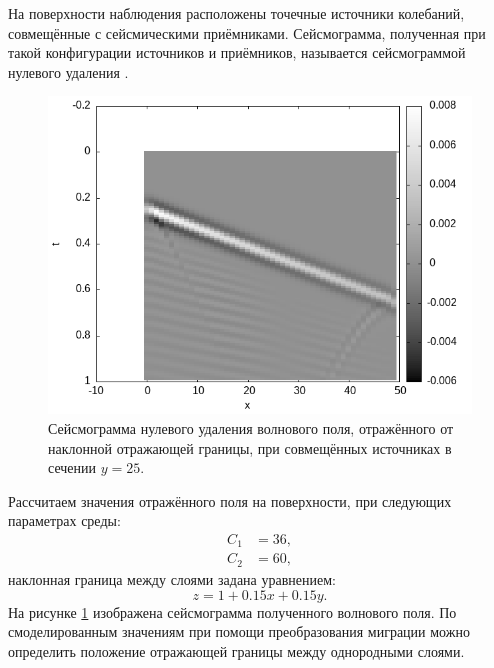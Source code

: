 \documentclass[a4paper, fontsize=14pt]{article}
\begin{document}
	На поверхности наблюдения расположены точечные источники колебаний, совмещённые с сейсмическими приёмниками. 
	Сейсмограмма, полученная при такой конфигурации источников и приёмников, называется сейсмограммой нулевого удаления \cite{timoshin}. 
	\begin{figure}[H]
		\centering
		\includegraphics[width=.7\textwidth]{tilt15c36_centr_seism.png}
		\caption{Сейсмограмма нулевого удаления волнового поля, отражённого от наклонной отражающей границы, при совмещённых источниках  в сечении $y=25$.}
		\label{fig:mig_tilt_seism}
	\end{figure}
	Рассчитаем значения отражённого поля на поверхности, при следующих параметрах среды: 
	\begin{align*}
		C_1 &= 36, \\
		C_2 &= 60,
	\end{align*}
	наклонная граница между слоями задана уравнением:
	\begin{equation}
		z=1+0.15 x+0.15 y.
		\label{eq:mig_mod}
	\end{equation}
	На рисунке \ref{fig:mig_tilt_seism} изображена сейсмограмма полученного волнового поля.
	По смоделированным значениям при помощи преобразования миграции можно определить положение отражающей границы между однородными слоями.  
	
\end{document}
